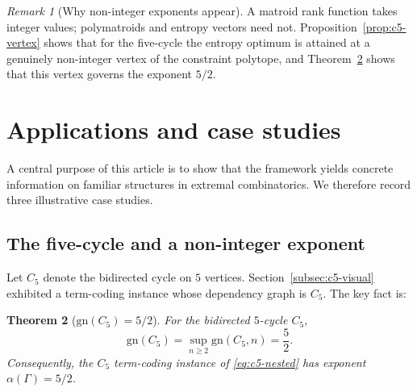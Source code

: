\documentclass[11pt]{article}
\theoremstyle{plain}
\newtheorem{theorem}{Theorem}[section]
\theoremstyle{definition}
\theoremstyle{definition}
\theoremstyle{remark}
\newtheorem{remark}[theorem]{Remark}
\newcommand{\gn}{\mathrm{gn}}
\begin{document}
\begin{remark}[Why non-integer exponents appear]
A matroid rank function takes integer values; polymatroids and entropy vectors need not.
Proposition~\ref{prop:c5-vertex} shows that for the five-cycle the entropy optimum is attained
at a genuinely non-integer vertex of the constraint polytope, and Theorem~\ref{thm:c5} shows
that this vertex governs the exponent $5/2$.
\end{remark}

\section{Applications and case studies}
\label{sec:applications}

A central purpose of this article is to show that the framework yields concrete information on familiar
structures in extremal combinatorics.
We therefore record three illustrative case studies.

\subsection{The five-cycle and a non-integer exponent}
\label{subsec:c5-exponent}

Let $C_5$ denote the bidirected cycle on $5$ vertices.
Section~\ref{subsec:c5-visual} exhibited a term-coding instance whose dependency graph is $C_5$.
The key fact is:

\begin{theorem}[$\gn(C_5)=5/2$]
\label{thm:c5}
For the bidirected $5$-cycle $C_5$,
\[\gn(C_5)=\sup_{n\ge 2}\gn(C_5,n)=\frac{5}{2}.
\]
Consequently, the $C_5$ term-coding instance of \eqref{eq:c5-nested} has exponent
$\alpha(\Gamma)=5/2$.
\end{theorem}
\end{document}
